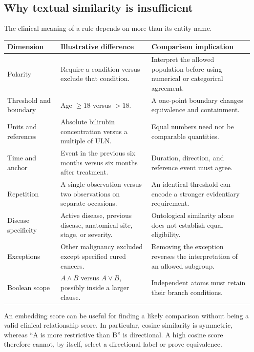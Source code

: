 \documentclass[10pt,letterpaper]{article}
\begin{document}
\subsection{Why textual similarity is insufficient}
The clinical meaning of a rule depends on more than its entity name.
\begin{longtable}{L{.20\linewidth}L{.34\linewidth}L{.37\linewidth}}
\toprule Dimension & Illustrative difference & Comparison implication\\\midrule
\endhead
Polarity & Require a condition versus exclude that condition. & Interpret the allowed population before using numerical or categorical agreement.\\
Threshold and boundary & Age $\geq18$ versus $>18$. & A one-point boundary changes equivalence and containment.\\
Units and references & Absolute bilirubin concentration versus a multiple of ULN. & Equal numbers need not be comparable quantities.\\
Time and anchor & Event in the previous six months versus six months after treatment. & Duration, direction, and reference event must agree.\\
Repetition & A single observation versus two observations on separate occasions. & An identical threshold can encode a stronger evidentiary requirement.\\
Disease specificity & Active disease, previous disease, anatomical site, stage, or severity. & Ontological similarity alone does not establish equal eligibility.\\
Exceptions & Other malignancy excluded except specified cured cancers. & Removing the exception reverses the interpretation of an allowed subgroup.\\
Boolean scope & $A\land B$ versus $A\lor B$, possibly inside a larger clause. & Independent atoms must retain their branch conditions.\\\bottomrule
\end{longtable}

An embedding score can be useful for finding a likely comparison without being
a valid clinical relationship score. In particular, cosine similarity is
symmetric, whereas ``A is more restrictive than B'' is directional. A high
cosine score therefore cannot, by itself, select a directional label or prove
equivalence.
\end{document}
